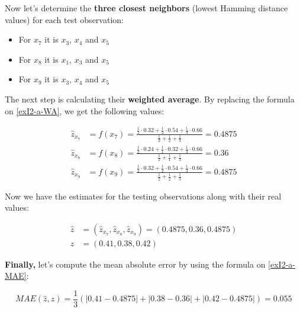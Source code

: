 \documentclass[12pt]{article}
\begin{document}
\begin{enumerate}[leftmargin=\labelsep]
\begin{enumerate}
          Now let's determine the \textbf{three closest neighbors} (lowest Hamming distance values) for each test observation:

          \begin{itemize}
            \item For $x_7$ it is $x_3$, $x_4$ and $x_5$
            \item For $x_8$ it is $x_1$, $x_3$ and $x_5$
            \item For $x_9$ it is $x_3$, $x_4$ and $x_5$
          \end{itemize}

          The next step is calculating their \textbf{weighted average}. By replacing the
          formula on \eqref{exI2-a-WA}, we get the following values:

          $$
              \begin{aligned}
                  \hat{z}_{x_7} & = f(x_7) = \frac{\frac{1}{2} \cdot 0.32 + \frac{1}{2} \cdot 0.54 + \frac{1}{3} \cdot 0.66}{\frac{1}{2} + \frac{1}{2} + \frac{1}{3}} = 0.4875 \\
                  \hat{z}_{x_8} & = f(x_8) = \frac{\frac{1}{2} \cdot 0.24 + \frac{1}{1} \cdot 0.32 + \frac{1}{3} \cdot 0.66}{\frac{1}{2} + \frac{1}{1} + \frac{1}{3}} = 0.36 \\
                  \hat{z}_{x_9} & = f(x_9) = \frac{\frac{1}{2} \cdot 0.32 + \frac{1}{2} \cdot 0.54 + \frac{1}{3} \cdot 0.66}{\frac{1}{2} + \frac{1}{2} + \frac{1}{3}} = 0.4875
              \end{aligned}
          $$

          Now we have the estimates for the testing observations along with their real values:

          $$
              \begin{aligned}
                  \hat{z} & = \left(\hat{z}_{x_7}, \hat{z}_{x_8}, \hat{z}_{x_9}\right) = \left(0.4875, 0.36, 0.4875\right) \\
                  z & = \left(0.41, 0.38, 0.42\right)
              \end{aligned}
          $$

          \textbf{Finally,} let's compute the mean absolute error by using the formula on \eqref{exI2-a-MAE}:

          \begin{equation*}
              MAE(\hat{z}, z) = \frac{1}{3} \left( \left|0.41 - 0.4875\right| + \left|0.38 - 0.36\right| + \left|0.42 - 0.4875\right| \right) = 0.055
          \end{equation*}

          \end{enumerate}
\end{enumerate}
\end{document}
